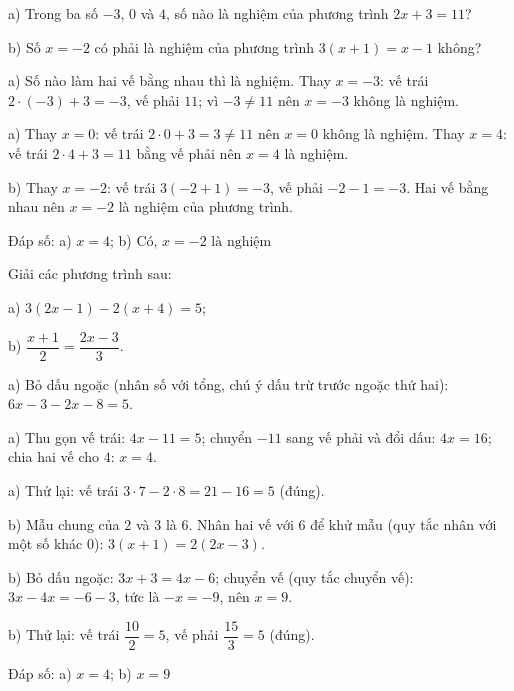 \begin{problem}[8DS-PT1-033]
a) Trong ba số $-3$, $0$ và $4$, số nào là nghiệm của phương trình $2x + 3 = 11$?

b) Số $x = -2$ có phải là nghiệm của phương trình $3(x + 1) = x - 1$ không?

\begin{solution}
a) Số nào làm hai vế bằng nhau thì là nghiệm. Thay $x = -3$: vế trái $2 \cdot (-3) + 3 = -3$, vế phải $11$; vì $-3 \neq 11$ nên $x = -3$ không là nghiệm.

a) Thay $x = 0$: vế trái $2 \cdot 0 + 3 = 3 \neq 11$ nên $x = 0$ không là nghiệm. Thay $x = 4$: vế trái $2 \cdot 4 + 3 = 11$ bằng vế phải nên $x = 4$ là nghiệm.

b) Thay $x = -2$: vế trái $3(-2 + 1) = -3$, vế phải $-2 - 1 = -3$. Hai vế bằng nhau nên $x = -2$ là nghiệm của phương trình.

Đáp số: a) $\boxed{x = 4}$; b) $\boxed{\text{Có, } x = -2 \text{ là nghiệm}}$
\end{solution}
\end{problem}

\begin{problem}[8DS-PT1-034]
Giải các phương trình sau:

a) $3(2x - 1) - 2(x + 4) = 5$;

b) $\dfrac{x + 1}{2} = \dfrac{2x - 3}{3}$.

\begin{solution}
a) Bỏ dấu ngoặc (nhân số với tổng, chú ý dấu trừ trước ngoặc thứ hai): $6x - 3 - 2x - 8 = 5$.

a) Thu gọn vế trái: $4x - 11 = 5$; chuyển $-11$ sang vế phải và đổi dấu: $4x = 16$; chia hai vế cho $4$: $x = 4$.

a) Thử lại: vế trái $3 \cdot 7 - 2 \cdot 8 = 21 - 16 = 5$ (đúng).

b) Mẫu chung của $2$ và $3$ là $6$. Nhân hai vế với $6$ để khử mẫu (quy tắc nhân với một số khác $0$): $3(x + 1) = 2(2x - 3)$.

b) Bỏ dấu ngoặc: $3x + 3 = 4x - 6$; chuyển vế (quy tắc chuyển vế): $3x - 4x = -6 - 3$, tức là $-x = -9$, nên $x = 9$.

b) Thử lại: vế trái $\dfrac{10}{2} = 5$, vế phải $\dfrac{15}{3} = 5$ (đúng).

Đáp số: a) $\boxed{x = 4}$; b) $\boxed{x = 9}$
\end{solution}
\end{problem}

